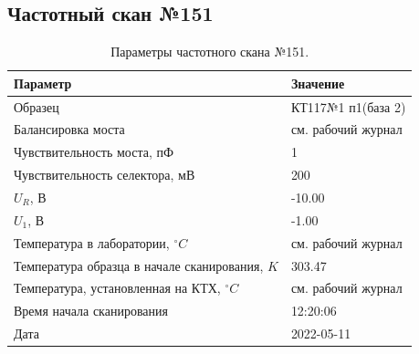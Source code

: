 \subsection{Частотный скан №151}
\begin{table}[!ht]
    \centering
    \caption{Параметры частотного скана №151.}
    \begin{tabular}{|l|l|}
        \hline
        Параметр                                       & Значение                  \\ \hline
        Образец                                        & КТ117№1 п1(база 2)        \\ \hline
        Балансировка моста                             & см. рабочий журнал        \\ \hline
        Чувствительность моста, пФ                     & 1                         \\ \hline
        Чувствительность селектора, мВ                 & 200                       \\ \hline
        $U_R$, В                                       & -10.00                    \\ \hline
        $U_1$, В                                       & -1.00                     \\ \hline
        Температура в лаборатории, $^\circ C$          & см. рабочий журнал        \\ \hline
        Температура образца в начале сканирования, $K$ & 303.47                    \\ \hline
        Температура, установленная на КТХ, $^\circ C$  & см. рабочий журнал        \\ \hline
        Время начала сканирования                      & 12:20:06                  \\ \hline
        Дата                                           & 2022-05-11                \\ \hline
    \end{tabular}
    \label{table:frequency_scan_151}
\end{table}

